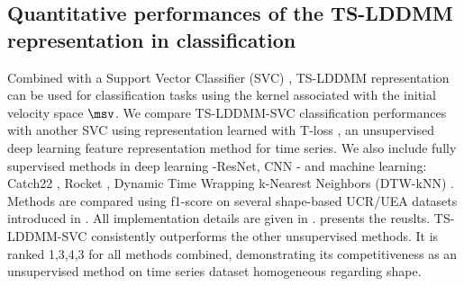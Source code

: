 
\subsection{Quantitative performances of the TS-LDDMM representation in classification}
Combined with a Support Vector Classifier (SVC) \cite{hsu2003practical}, TS-LDDMM representation can be used for 
classification tasks using the kernel associated with the initial velocity space $\msv$.
We compare TS-LDDMM-SVC classification performances with another SVC using representation 
learned with T-loss \cite{franceschi2019unsupervised}, an unsupervised deep learning feature 
representation method for time series. We also include fully supervised methods in deep learning 
-ResNet, CNN \cite{ismail2019deep}- and machine learning: Catch22 \cite{lubba2019catch22}, Rocket
\cite{dempster2020rocket}, Dynamic Time Wrapping k-Nearest Neighbors (DTW-kNN) 
\cite{muller2007dynamic}. Methods are compared using f1-score on several shape-based UCR/UEA datasets 
\cite{dau2019ucr,bagnall2018uea} introduced in . All implementation details are given 
in .
 presents the reuslts. TS-LDDMM-SVC consistently outperforms the other unsupervised methods. It is ranked 1,3,4,3 for all methods combined, 
demonstrating its competitiveness as an unsupervised method on time series dataset homogeneous regarding shape.


